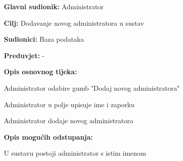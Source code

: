 					
										\noindent {}
					\begin{packed_item}
	
						\item \textbf{Glavni sudionik: } Administrator
						\item  \textbf{Cilj:} Dodavanje novog administratora u sustav
						\item  \textbf{Sudionici:} Baza podataka
						\item  \textbf{Preduvjet:} -
						\item  \textbf{Opis osnovnog tijeka:}
						
						\item[] \begin{packed_enum}
	
							    \item Administrator odabire gumb "Dodaj novog administratora"
    							\item Administrator u polje upisuje ime i zaporku
 								\item Administrator dodaje novog administratora
						\end{packed_enum}
						
						\item  \textbf{Opis mogućih odstupanja:}
						
						\item[] \begin{packed_item}
	
							\item[2.b] 
							\item[] \begin{packed_enum}
								
								\item U sustavu postoji administrator s istim imenom
								
							\end{packed_enum}
							
						\end{packed_item}
					\end{packed_item}
					
